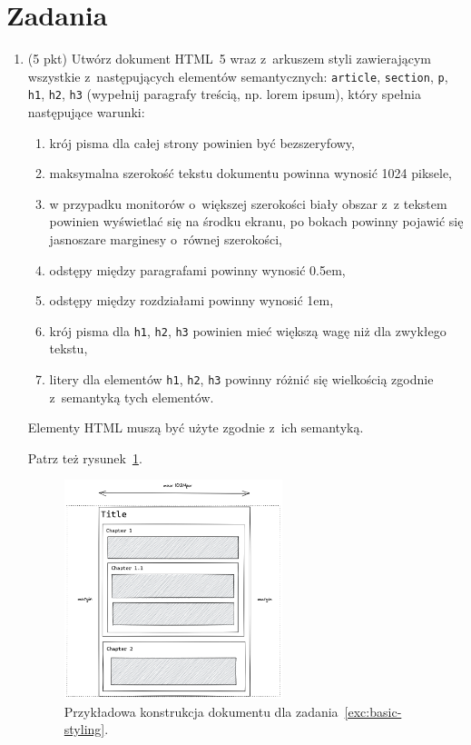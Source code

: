 \documentclass[12pt]{article}
\begin{document}
    \section*{Zadania}
    \begin{enumerate}
        \item\label{exc:basic-styling}
            (5 pkt) Utwórz dokument HTML~5 wraz z~arkuszem styli zawierającym wszystkie z~następujących elementów semantycznych: \texttt{article}, \texttt{section}, \texttt{p}, \texttt{h1}, \texttt{h2}, \texttt{h3} (wypełnij paragrafy treścią, np. lorem ipsum), który spełnia następujące warunki:
            \begin{enumerate}
                \item krój pisma dla całej strony powinien być bezszeryfowy,
                \item maksymalna szerokość tekstu dokumentu powinna wynosić 1024 piksele,
                \item w przypadku monitorów o~większej szerokości biały obszar z~z tekstem powinien wyświetlać się na środku ekranu, po bokach powinny pojawić się jasnoszare marginesy o~równej szerokości,
                \item odstępy między paragrafami powinny wynosić 0.5em,
                \item odstępy między rozdziałami powinny wynosić 1em,
                \item krój pisma dla \texttt{h1}, \texttt{h2}, \texttt{h3} powinien mieć większą wagę niż dla zwykłego tekstu,
                \item litery dla elementów \texttt{h1}, \texttt{h2}, \texttt{h3} powinny różnić się wielkością zgodnie z~semantyką tych elementów.
            \end{enumerate}

            Elementy HTML muszą być użyte zgodnie z~ich semantyką.

            Patrz też rysunek~\ref{fig:basic-styling}.

            \begin{figure}[p]
                \centering
                \includegraphics[width=0.6\textwidth]{lista-1-1}
                \caption{Przykładowa konstrukcja dokumentu dla zadania~\ref{exc:basic-styling}.}
                \label{fig:basic-styling}
            \end{figure}


\end{enumerate}
\end{document}
